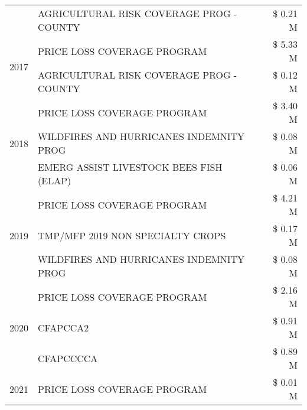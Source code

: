 \begin{tabular}{llr}
 & AGRICULTURAL RISK COVERAGE PROG - COUNTY & \$ 0.21 M \\
\cline{1-3}
\multirow[t]{2}{*}{2017} & PRICE LOSS COVERAGE PROGRAM & \$ 5.33 M \\
 & AGRICULTURAL RISK COVERAGE PROG - COUNTY & \$ 0.12 M \\
\cline{1-3}
\multirow[t]{3}{*}{2018} & PRICE LOSS COVERAGE PROGRAM & \$ 3.40 M \\
 & WILDFIRES AND HURRICANES INDEMNITY PROG & \$ 0.08 M \\
 & EMERG ASSIST LIVESTOCK BEES FISH (ELAP) & \$ 0.06 M \\
\cline{1-3}
\multirow[t]{3}{*}{2019} & PRICE LOSS COVERAGE PROGRAM & \$ 4.21 M \\
 & TMP/MFP 2019 NON SPECIALTY CROPS & \$ 0.17 M \\
 & WILDFIRES AND HURRICANES INDEMNITY PROG & \$ 0.08 M \\
\cline{1-3}
\multirow[t]{3}{*}{2020} & PRICE LOSS COVERAGE PROGRAM & \$ 2.16 M \\
 & CFAPCCA2 & \$ 0.91 M \\
 & CFAPCCCCA & \$ 0.89 M \\
\cline{1-3}
2021 & PRICE LOSS COVERAGE PROGRAM & \$ 0.01 M \\
\cline{1-3}
\bottomrule
\end{tabular}

